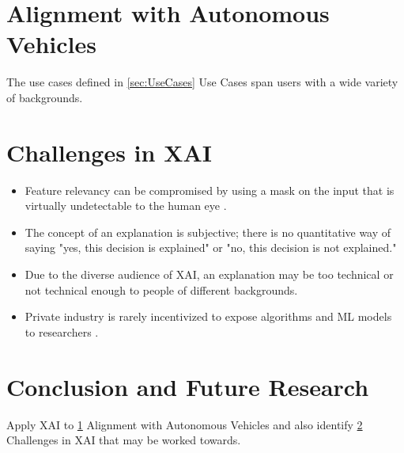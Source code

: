 \documentclass{IEEEtran}
\begin{document}
\section{Alignment with Autonomous Vehicles}\label{sec:Alignment}

The use cases defined in \ref{sec:UseCases} Use Cases span users with a wide variety of backgrounds.

\section{Challenges in XAI} \label{sec:Challenges}

\begin{itemize}
    \item Feature relevancy can be compromised by using a mask on the input that is virtually undetectable to the human eye \cite{DBLP:journals/corr/abs-1812-00891}.

    \item The concept of an explanation is subjective; there is no quantitative way of saying "yes, this decision is explained" or "no, this decision is not explained." \cite{Bibal2016}

    \item Due to the diverse audience of XAI, an explanation may be too technical or not technical enough to people of different backgrounds.
    
    \item Private industry is rarely incentivized to expose algorithms and ML models to researchers \cite{Veale:2018:FAD:3173574.3174014}.
\end{itemize}

\section{Conclusion and Future Research}

Apply XAI to \ref{sec:Alignment} Alignment with Autonomous Vehicles and also identify \ref{sec:Challenges} Challenges in XAI that may be worked towards.


 
\end{document}
